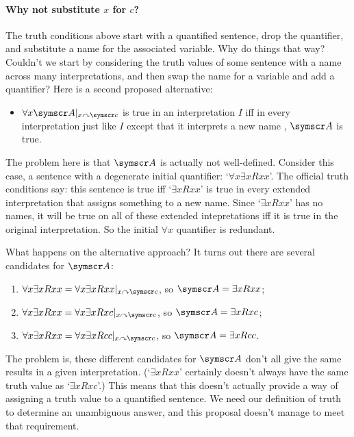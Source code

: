 \begin{earg}
\paragraph{Why not substitute $x$ for $c$?} The truth conditions above start with a quantified sentence, drop the quantifier, and substitute a name for the associated variable. Why do things that way? Couldn't we start by considering the truth values of some sentence with a name across many interpretations, and then swap the name for a variable and add a quantifier? Here is a second proposed alternative: \begin{itemize}
	\item $\forall x \meta{A}\subs{x}{\meta{c}}$ is true in an interpretation $I$ iff in every interpretation just like $I$ except that it interprets a new name , $\meta{A}$ is true.
\end{itemize} 
The problem here is that $\meta{A}$ is actually not well-defined. Consider this case, a sentence with a degenerate initial quantifier: `$\forall x \exists x Rxx$'. The official truth conditions say: this sentence is true iff `$\exists x Rxx$' is true in every extended interpretation that assigns something to a new name. Since `$\exists x Rxx$' has no names, it will be true on all of these extended intepretations iff it is true in the original interpretation. So the initial $\forall x$ quantifier is redundant.

What happens on the alternative approach? It turns out there are several candidates for $\meta{A}$: \begin{enumerate}
	\item $\forall x \exists x Rxx = \forall x \exists x Rxx\subs{x}{\meta{c}}$, so $\meta{A} = \exists x Rxx$;
	\item $\forall x \exists x Rxx = \forall x \exists x Rxc\subs{x}{\meta{c}}$, so $\meta{A} = \exists x Rxc$;
	\item $\forall x \exists x Rxx = \forall x \exists x Rcc\subs{x}{\meta{c}}$, so $\meta{A} = \exists x Rcc$.
\end{enumerate} The problem is, these different candidates for $\meta{A}$ don't all give the same results in a given interpretation. (`$\exists x Rxx$' certainly doesn't always have the same truth value as `$\exists x Rxc$'.) This means that this doesn't actually provide a way of assigning a truth value to a quantified sentence. We need our definition of truth to determine an unambiguous answer, and this proposal doesn't manage to meet that requirement.



\end{earg}

